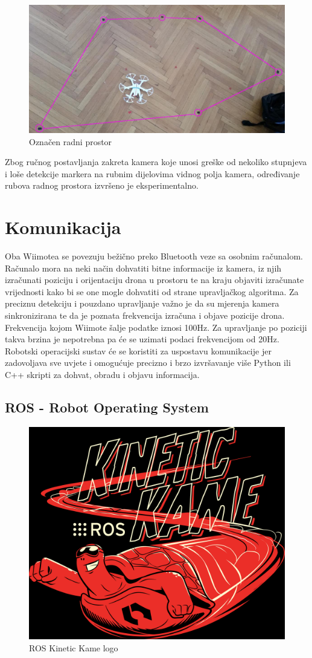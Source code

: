 \documentclass[times, utf8, diplomski]{fer}
\begin{document}
\begin{figure}[h]
\centering
\includegraphics[width=.7\textwidth]{radni_prostor}
\caption{Označen radni prostor}
\label{fig:radni}
\end{figure} 

Zbog ručnog postavljanja zakreta kamera koje unosi greške od nekoliko stupnjeva i loše detekcije markera na rubnim dijelovima vidnog polja kamera, određivanje rubova radnog prostora izvršeno je eksperimentalno.


\chapter{Komunikacija}
Oba Wiimotea se povezuju bežično preko Bluetooth veze sa osobnim računalom. Računalo mora na neki način dohvatiti bitne informacije iz kamera, iz njih izračunati poziciju i orijentaciju drona u prostoru te na kraju objaviti izračunate vrijednosti kako bi se one mogle dohvatiti od strane upravljačkog algoritma. Za preciznu detekciju i pouzdano upravljanje važno je da su mjerenja kamera sinkronizirana te da je poznata frekvencija izračuna i objave pozicije drona. Frekvencija kojom Wiimote šalje podatke iznosi 100Hz. Za upravljanje po poziciji takva brzina je nepotrebna pa će se uzimati podaci frekvencijom od 20Hz. Robotski operacijski sustav će se koristiti za uspostavu komunikacije jer zadovoljava sve uvjete i omogućuje precizno i brzo izvršavanje više Python ili C++ skripti za dohvat, obradu i objavu informacija.
 
\section{ROS - Robot Operating System}
\begin{figure}[h]
\centering
\includegraphics[width=.45\textwidth]{ros_kinetic}
\caption{ROS Kinetic Kame logo \protect\footnotemark}
\label{fig:ros_kin}
\end{figure}
\end{document}
